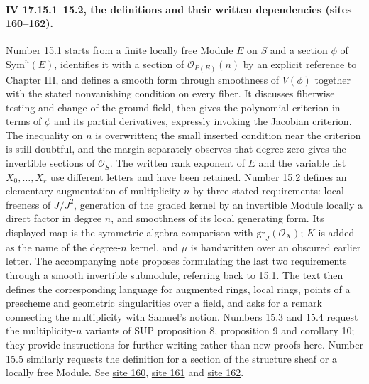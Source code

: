 \paragraph{IV 17.15.1--15.2, the definitions and their written dependencies (sites 160--162).}
Number 15.1 starts from a finite locally free Module $E$ on $S$ and a section $\phi$ of $\mathrm{Sym}^n(E)$, identifies it with a section of $\mathcal O_{P(E)}(n)$ by an explicit reference to Chapter III, and defines a smooth form through smoothness of $V(\phi)$ together with the stated nonvanishing condition on every fiber. It discusses fiberwise testing and change of the ground field, then gives the polynomial criterion in terms of $\phi$ and its partial derivatives, expressly invoking the Jacobian criterion. The inequality on $n$ is overwritten; the small inserted condition near the criterion is still doubtful, and the margin separately observes that degree zero gives the invertible sections of $\mathcal O_S$. The written rank exponent of $E$ and the variable list $X_0,\ldots,X_r$ use different letters and have been retained. Number 15.2 defines an elementary augmentation of multiplicity $n$ by three stated requirements: local freeness of $J/J^2$, generation of the graded kernel by an invertible Module locally a direct factor in degree $n$, and smoothness of its local generating form. Its displayed map is the symmetric-algebra comparison with $\mathrm{gr}_J(\mathcal O_X)$; $K$ is added as the name of the degree-$n$ kernel, and $\mu$ is handwritten over an obscured earlier letter. The accompanying note proposes formulating the last two requirements through a smooth invertible submodule, referring back to 15.1. The text then defines the corresponding language for augmented rings, local rings, points of a prescheme and geometric singularities over a field, and asks for a remark connecting the multiplicity with Samuel's notion. Numbers 15.3 and 15.4 request the multiplicity-$n$ variants of SUP proposition 8, proposition 9 and corollary 10; they provide instructions for further writing rather than new proofs here. Number 15.5 similarly requests the definition for a section of the structure sheaf or a locally free Module. See \href{https://grothendieck.umontpellier.fr/web/viewer.html?file=../25.pdf#page=161}{site 160}, \href{https://grothendieck.umontpellier.fr/web/viewer.html?file=../25.pdf#page=162}{site 161} and \href{https://grothendieck.umontpellier.fr/web/viewer.html?file=../25.pdf#page=163}{site 162}.

